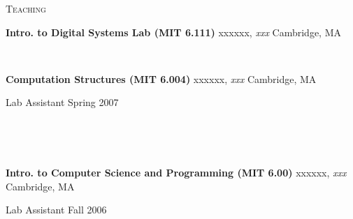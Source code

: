 \documentclass[10pt,minionpro]{report}
\newlength{\sectiongap}
\newlength{\entrygap}
\newlength{\sectioncolwidth}
\newlength{\colgap}
\newlength{\stuffwidth}
\def\ifEqString#1#2{\def\testa{#1}\def\testb{#2}%
  \ifx\testa\testb}
\newenvironment{rtable}{
  \begin{minipage}{\textwidth}
  }{
  \end{minipage}
}
\newenvironment{rentry}[3][xxx]{
  \begin{minipage}[t]{\hsize}
    \textbf{#2}\ifEqString{#1}{xxx}\relax\else, \textit{#1}\fi
    \hspace{\stretch{1}} #3 \\
  }{
    \removelastskip
  \end{minipage}
  \\[\entrygap]  %
}
\newcommand{\rline}[2]{
  \begin{minipage}[t]{\hsize}
    #1 \hspace{\stretch{1}} #2
  \end{minipage} \\
}
\newenvironment{rsection}[1]{
  \begin{minipage}[t]{\sectioncolwidth}
    \textsc{#1}
  \end{minipage}
  \hspace{\colgap}
  \begin{minipage}[t]{\stuffwidth}
  }{
    \removelastskip
  \end{minipage}
  \\[\sectiongap]
}
\begin{document}
\begin{rtable}
\begin{rsection}{Teaching}
\begin{rentry}{Intro. to Digital Systems Lab (MIT
        6.111)}{Cambridge, MA}
      \vspace{-0.5em}
    \end{rentry}
    \begin{rentry}{Computation Structures (MIT 6.004)}{Cambridge, MA}
      \rline{Lab Assistant}{Spring 2007}
      \vspace{-0.5em}
    \end{rentry}
    \begin{rentry}{Intro. to Computer Science and
        Programming (MIT 6.00)}{Cambridge, MA}
      \rline{Lab Assistant}{Fall 2006}
      \vspace{-1em}
    \end{rentry}
  \end{rsection}


\end{rtable}
\end{document}
